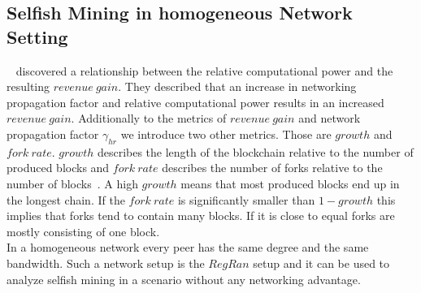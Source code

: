 \subsection{Selfish Mining in homogeneous Network Setting}
\citeauthor{eyal}~\cite{eyal} discovered a relationship between the relative computational power and the resulting $revenue~gain$. They described that an increase in networking propagation factor and relative computational power results in an increased $revenue~gain$. Additionally to the metrics of $revenue~gain$ and network propagation factor $\gamma_{hr}$ we introduce two other metrics. Those are $growth$ and $fork~rate$. $growth$ describes the length of the blockchain relative to the number of produced blocks and $fork~rate$ describes the number of forks relative to the number of blocks~\cite{BlockPropOld}. A high $growth$ means that most produced blocks end up in the longest chain. If the $fork~rate$ is significantly smaller than $1-growth$ this implies that forks tend to contain many blocks. If it is close to equal forks are mostly consisting of one block.\\
In a homogeneous network every peer has the same degree and the same bandwidth. Such a network setup is the $RegRan$ setup and it can be used to analyze selfish mining in a scenario without any networking advantage.
